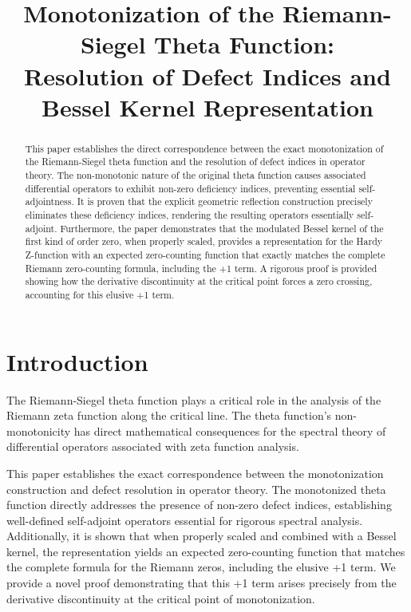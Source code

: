 \documentclass{article}
\title{Monotonization of the Riemann-Siegel Theta Function: \\ Resolution of Defect Indices and Bessel Kernel Representation}
\author{}
\date{}
\theoremstyle{definition}
\begin{document}
\maketitle

\begin{abstract}
This paper establishes the direct correspondence between the exact monotonization of the Riemann-Siegel theta function and the resolution of defect indices in operator theory. The non-monotonic nature of the original theta function causes associated differential operators to exhibit non-zero deficiency indices, preventing essential self-adjointness. It is proven that the explicit geometric reflection construction precisely eliminates these deficiency indices, rendering the resulting operators essentially self-adjoint. Furthermore, the paper demonstrates that the modulated Bessel kernel of the first kind of order zero, when properly scaled, provides a representation for the Hardy Z-function with an expected zero-counting function that exactly matches the complete Riemann zero-counting formula, including the +1 term. A rigorous proof is provided showing how the derivative discontinuity at the critical point forces a zero crossing, accounting for this elusive +1 term.
\end{abstract}

\section{Introduction}

The Riemann-Siegel theta function plays a critical role in the analysis of the Riemann zeta function along the critical line. The theta function's non-monotonicity has direct mathematical consequences for the spectral theory of differential operators associated with zeta function analysis.

This paper establishes the exact correspondence between the monotonization construction and defect resolution in operator theory. The monotonized theta function directly addresses the presence of non-zero defect indices, establishing well-defined self-adjoint operators essential for rigorous spectral analysis. Additionally, it is shown that when properly scaled and combined with a Bessel kernel, the representation yields an expected zero-counting function that matches the complete formula for the Riemann zeros, including the elusive +1 term. We provide a novel proof demonstrating that this +1 term arises precisely from the derivative discontinuity at the critical point of monotonization.
\end{document}
